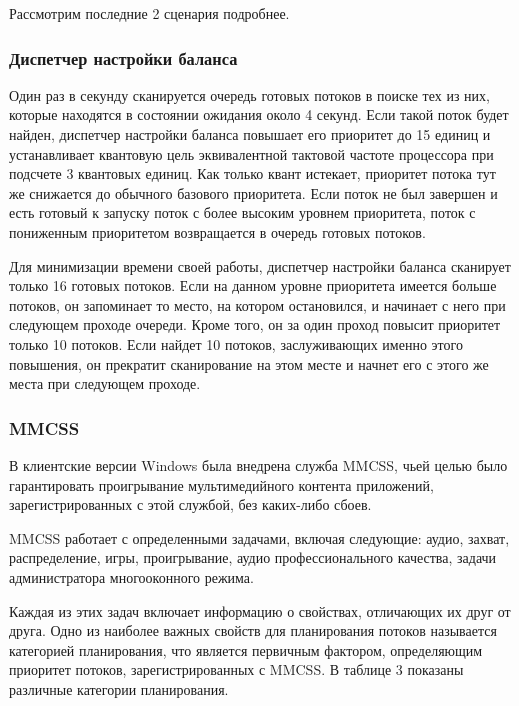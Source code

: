 Рассмотрим последние 2 сценария подробнее. 

\subsubsection*{Диспетчер настройки баланса}

Один раз в секунду сканируется очередь готовых потоков в поиске тех из них, которые находятся в состоянии ожидания около 4 секунд. Если такой поток будет найден, диспетчер настройки баланса повышает его приоритет до 15 единиц и устанавливает квантовую цель эквивалентной тактовой частоте процессора при подсчете 3 квантовых единиц. Как только квант истекает, приоритет потока тут же снижается до обычного базового приоритета. Если поток не был завершен и есть готовый к запуску поток с более высоким уровнем приоритета, поток с пониженным приоритетом возвращается в очередь готовых потоков.

Для минимизации времени своей работы, диспетчер настройки баланса сканирует только 16 готовых потоков. Если на данном уровне приоритета имеется больше потоков, он запоминает то место, на котором остановился, и начинает с него при следующем проходе очереди. Кроме того, он за один проход повысит приоритет только 10 потоков. Если найдет 10 потоков, заслуживающих именно этого повышения, он прекратит сканирование на этом месте и начнет его с этого же места при следующем проходе.

\subsubsection*{MMCSS}

В клиентские версии Windows была внедрена служба MMCSS, чьей целью было гарантировать проигрывание мультимедийного контента приложений, зарегистрированных с этой службой, без каких-либо сбоев.

MMCSS работает с определенными задачами, включая следующие: аудио, захват, распределение, игры, проигрывание, аудио профессионального качества, задачи администратора многооконного режима.

Каждая из этих задач включает информацию о свойствах, отличающих
их друг от друга. Одно из наиболее важных свойств для планирования потоков называется категорией планирования, что является первичным фактором, определяющим приоритет потоков, зарегистрированных с MMCSS. В таблице 3 показаны различные категории планирования.

